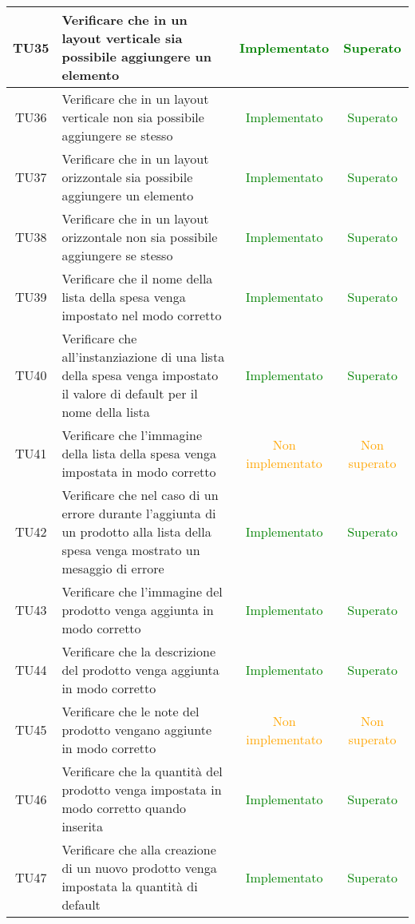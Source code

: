 \begin{center}
\begin{longtable}{|c|>{\centering}m{10cm}|c|c|}
		TU35 & Verificare che in un layout verticale sia possibile aggiungere un elemento & \textcolor{Green}{Implementato} & \textcolor{Green}{Superato} \\ \hline
		TU36 & Verificare che in un layout verticale non sia possibile aggiungere se stesso & \textcolor{Green}{Implementato} & \textcolor{Green}{Superato} \\ \hline
		TU37 & Verificare che in un layout orizzontale sia possibile aggiungere un elemento & \textcolor{Green}{Implementato} & \textcolor{Green}{Superato} \\ \hline
		TU38 & Verificare che in un layout orizzontale non sia possibile aggiungere se stesso & \textcolor{Green}{Implementato} & \textcolor{Green}{Superato} \\ \hline
		TU39 & Verificare che il nome della lista della spesa venga impostato nel modo corretto & \textcolor{Green}{Implementato} & \textcolor{Green}{Superato} \\ \hline
		TU40 & Verificare che all'instanziazione di una lista della spesa venga impostato il valore di default per il nome della lista & \textcolor{Green}{Implementato} & \textcolor{Green}{Superato} \\ \hline
		TU41 & Verificare che l'immagine della lista della spesa venga impostata in modo corretto & \textcolor{Orange}{Non implementato} & \textcolor{Orange}{Non superato} \\ \hline
		TU42 & Verificare che nel caso di un errore durante l'aggiunta di un prodotto alla lista della spesa venga mostrato un mesaggio di errore & \textcolor{Green}{Implementato} & \textcolor{Green}{Superato} \\ \hline
		TU43 & Verificare che l'immagine del prodotto venga aggiunta in modo corretto & \textcolor{Green}{Implementato} & \textcolor{Green}{Superato} \\ \hline
		TU44 & Verificare che la descrizione del prodotto venga aggiunta in modo corretto & \textcolor{Green}{Implementato} & \textcolor{Green}{Superato} \\ \hline
		TU45 & Verificare che le note del prodotto vengano aggiunte in modo corretto & \textcolor{Orange}{Non implementato} & \textcolor{Orange}{Non superato} \\ \hline
		TU46 & Verificare che la quantità del prodotto venga impostata in modo corretto quando inserita & \textcolor{Green}{Implementato} & \textcolor{Green}{Superato} \\ \hline
		TU47 & Verificare che alla creazione di un nuovo prodotto venga impostata la quantità di default & \textcolor{Green}{Implementato} & \textcolor{Green}{Superato} \\ \hline

\end{longtable}
\end{center}
